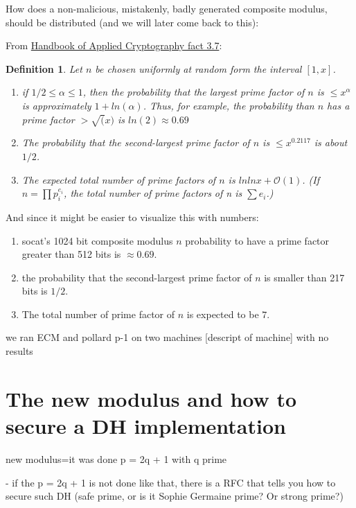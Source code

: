 \documentclass[a4paper,11pt]{article}
\newtheorem{definition}{Definition}
\begin{document}
How does a non-malicious, mistakenly, badly generated composite modulus, should be distributed (and we will later come back to this):

From \href{http://cacr.uwaterloo.ca/hac/about/chap3.pdf}{Handbook of Applied Cryptography fact 3.7}:

\begin{definition}
    Let $n$ be chosen uniformly at random form the interval $[1, x]$.
    \begin{enumerate}
        \item if $1/2 \leq \alpha \leq 1$, then the probability that the largest prime factor of $n$ is $\leq x^{\alpha}$ is approximately $1+ ln(\alpha)$. Thus, for example, the probability than $n$ has a prime factor $> \sqrt(x)$ is $ln(2) \approx 0.69$
        \item The probability that the second-largest prime factor of $n$ is $\leq x^{0.2117}$ is about $1/2$. 
        \item The expected total number of prime factors of $n$ is $ln ln x + \mathcal{O}(1)$. (If $n = \prod p_i^{e_i}$, the total number of prime factors of n is $\sum e_i$.)
    \end{enumerate} 
\end{definition}

And since it might be easier to visualize this with numbers:

\begin{enumerate}
    \item socat's 1024 bit composite modulus $n$ probability to have a prime factor greater than 512 bits is $\approx 0.69$.
    \item the probability that the second-largest prime factor of $n$ is smaller than 217 bits is $1/2$.
    \item The total number of prime factor of $n$ is expected to be $7$.
\end{enumerate}


we ran ECM and pollard p-1 on two machines [descript of machine] with no results

\section{The new modulus and how to secure a DH implementation}

new modulus=it was done p = 2q + 1 with q prime


- if the p = 2q + 1 is not done like that, there is a RFC that tells you how to secure such DH (safe prime, or is it Sophie Germaine prime? Or strong prime?)
\end{document}
